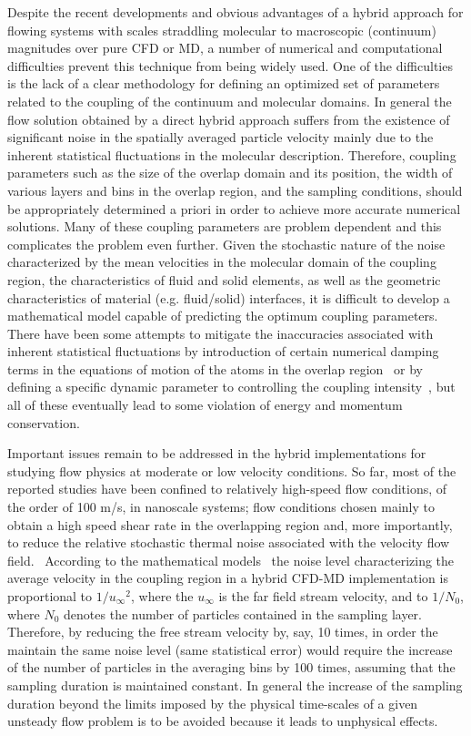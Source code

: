 \documentclass[preprint,12pt]{elsarticle}
\begin{document}
Despite the recent developments and obvious advantages of a hybrid approach for flowing systems with scales straddling molecular to macroscopic (continuum) magnitudes over pure CFD or MD, a number of numerical and computational difficulties prevent this technique from being widely used.
One of the difficulties is the lack of a clear methodology for defining an optimized set of parameters related to the coupling of the continuum and molecular domains. 
In general the flow solution obtained by a direct hybrid approach suffers from the existence of significant noise in the spatially averaged particle velocity mainly due to the inherent statistical fluctuations in the molecular description. Therefore, coupling parameters such as the size of the overlap domain and its position, the width of various layers and bins in the overlap region, and the sampling conditions, should be appropriately determined a priori in order to achieve more accurate numerical solutions.
Many of these coupling parameters are problem dependent and this complicates the problem even further. 
Given the stochastic nature of the noise characterized by the mean velocities in the molecular domain of the coupling region, the characteristics of fluid and solid elements, as well as the geometric characteristics of material (e.g. fluid/solid) interfaces, it is difficult to develop a mathematical model capable of predicting the optimum coupling parameters. 
There have been some attempts to mitigate the inaccuracies associated with inherent statistical fluctuations by introduction of certain numerical damping terms in the equations of motion of the atoms in the overlap region~\cite{Thompson,Cui} or by defining a specific dynamic parameter to controlling the coupling intensity~\cite{Wang}, but all of these eventually lead to some violation of energy and momentum conservation. 


Important issues remain to be addressed in the hybrid implementations for studying flow physics at moderate or low velocity conditions.  So far, most of the reported studies have been confined to relatively high-speed flow conditions, of the order of 100 m/s, in nanoscale systems; flow conditions chosen mainly to obtain a high speed shear rate in the overlapping region and, more importantly, to reduce the relative stochastic thermal noise associated with the velocity flow field.~\cite{Yen} 
According to the mathematical models~\cite{Hadjicon3,Time_Mechanism} the noise level characterizing the average velocity in the coupling region in a hybrid CFD-MD implementation is proportional to ${{1} / {{u}_{\infty}}^2}$, where the ${u_{\infty}}$ is the far field stream velocity, and to ${{1} / {N_0}}$, where ${N_0}$ denotes the number of particles contained in the sampling layer. Therefore, by reducing the free stream velocity by, say, 10 times, in order the maintain the same noise level (same statistical error)  would require the increase of the number of particles in the averaging bins by 100 times, assuming that the sampling duration is maintained constant. In general the increase of the sampling duration beyond the limits imposed by the physical time-scales of a given unsteady flow problem is to be avoided because it leads to unphysical effects.
\end{document}
